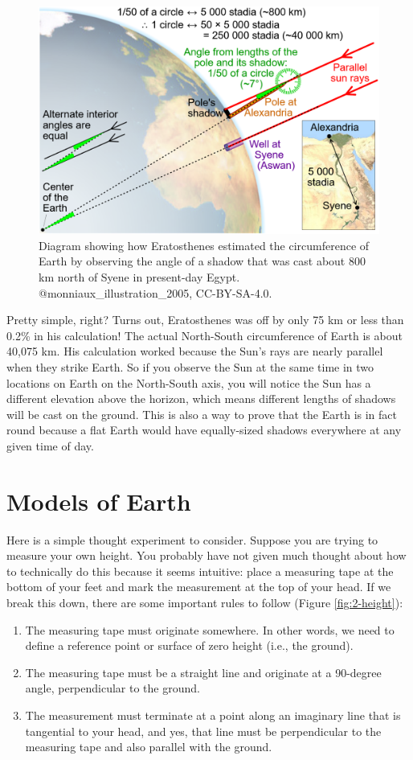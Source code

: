 \documentclass[
]{book}
\providecommand{\tightlist}{%
  \setlength{\itemsep}{0pt}\setlength{\parskip}{0pt}}
\begin{document}
\begin{figure}
\includegraphics[width=0.75\linewidth]{images/02-Eratosthenes} \caption{Diagram showing how Eratosthenes estimated the circumference of Earth by observing the angle of a shadow that was cast about 800 km north of Syene in present-day Egypt. @monniaux_illustration_2005, CC-BY-SA-4.0.}\label{fig:2-Eratosthenes}
\end{figure}

Pretty simple, right? Turns out, Eratosthenes was off by only 75 km or less than 0.2\% in his calculation! The actual North-South circumference of Earth is about 40,075 km. His calculation worked because the Sun's rays are nearly parallel when they strike Earth. So if you observe the Sun at the same time in two locations on Earth on the North-South axis, you will notice the Sun has a different elevation above the horizon, which means different lengths of shadows will be cast on the ground. This is also a way to prove that the Earth is in fact round because a flat Earth would have equally-sized shadows everywhere at any given time of day.

\hypertarget{models-of-earth}{%
\section{Models of Earth}\label{models-of-earth}}

Here is a simple thought experiment to consider. Suppose you are trying to measure your own height. You probably have not given much thought about how to technically do this because it seems intuitive: place a measuring tape at the bottom of your feet and mark the measurement at the top of your head. If we break this down, there are some important rules to follow (Figure \ref{fig:2-height}):

\begin{enumerate}
\def\labelenumi{\arabic{enumi}.}
\tightlist
\item
  The measuring tape must originate somewhere. In other words, we need to define a reference point or surface of zero height (i.e., the ground).
\item
  The measuring tape must be a straight line and originate at a 90-degree angle, perpendicular to the ground.
\item
  The measurement must terminate at a point along an imaginary line that is tangential to your head, and yes, that line must be perpendicular to the measuring tape and also parallel with the ground.
\end{enumerate}
\end{document}
